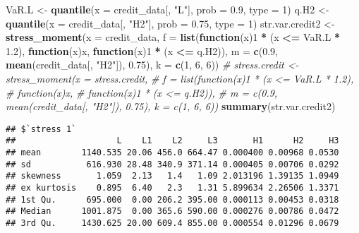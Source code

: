 \documentclass[]{article}
\newenvironment{Shaded}{\begin{snugshade}}{\end{snugshade}}
\newcommand{\CommentTok}[1]{\textcolor[rgb]{0.56,0.35,0.01}{\textit{#1}}}
\newcommand{\ControlFlowTok}[1]{\textcolor[rgb]{0.13,0.29,0.53}{\textbf{#1}}}
\newcommand{\DataTypeTok}[1]{\textcolor[rgb]{0.13,0.29,0.53}{#1}}
\newcommand{\DecValTok}[1]{\textcolor[rgb]{0.00,0.00,0.81}{#1}}
\newcommand{\FloatTok}[1]{\textcolor[rgb]{0.00,0.00,0.81}{#1}}
\newcommand{\KeywordTok}[1]{\textcolor[rgb]{0.13,0.29,0.53}{\textbf{#1}}}
\newcommand{\NormalTok}[1]{#1}
\newcommand{\OperatorTok}[1]{\textcolor[rgb]{0.81,0.36,0.00}{\textbf{#1}}}
\newcommand{\StringTok}[1]{\textcolor[rgb]{0.31,0.60,0.02}{#1}}
\begin{document}
\begin{Shaded}
\begin{Highlighting}[]
\NormalTok{VaR.L <-}\StringTok{ }\KeywordTok{quantile}\NormalTok{(}\DataTypeTok{x =}\NormalTok{ credit_data[, }\StringTok{"L"}\NormalTok{], }\DataTypeTok{prob =} \FloatTok{0.9}\NormalTok{, }\DataTypeTok{type =} \DecValTok{1}\NormalTok{)}
\NormalTok{q.H2 <-}\StringTok{ }\KeywordTok{quantile}\NormalTok{(}\DataTypeTok{x =}\NormalTok{ credit_data[, }\StringTok{"H2"}\NormalTok{], }\DataTypeTok{prob =} \FloatTok{0.75}\NormalTok{, }\DataTypeTok{type =} \DecValTok{1}\NormalTok{)}
\NormalTok{str.var.credit2 <-}\StringTok{ }\KeywordTok{stress_moment}\NormalTok{(}\DataTypeTok{x =}\NormalTok{ credit_data,}
                                \DataTypeTok{f =} \KeywordTok{list}\NormalTok{(}\ControlFlowTok{function}\NormalTok{(x)}\DecValTok{1} \OperatorTok{*}\StringTok{ }\NormalTok{(x }\OperatorTok{<=}\StringTok{ }\NormalTok{VaR.L }\OperatorTok{*}\StringTok{ }\FloatTok{1.2}\NormalTok{),}
                                         \ControlFlowTok{function}\NormalTok{(x)x,}
                                         \ControlFlowTok{function}\NormalTok{(x)}\DecValTok{1} \OperatorTok{*}\StringTok{ }\NormalTok{(x }\OperatorTok{<=}\StringTok{ }\NormalTok{q.H2)),}
                                \DataTypeTok{m =} \KeywordTok{c}\NormalTok{(}\FloatTok{0.9}\NormalTok{, }\KeywordTok{mean}\NormalTok{(credit_data[, }\StringTok{"H2"}\NormalTok{]), }\FloatTok{0.75}\NormalTok{),}
                                \DataTypeTok{k =} \KeywordTok{c}\NormalTok{(}\DecValTok{1}\NormalTok{, }\DecValTok{6}\NormalTok{, }\DecValTok{6}\NormalTok{))}
\CommentTok{# stress.credit <- stress_moment(x = stress.credit,}
\CommentTok{#                                f = list(function(x)1 * (x <= VaR.L * 1.2),}
\CommentTok{#                                         function(x)x,}
\CommentTok{#                                         function(x)1 * (x <= q.H2)),}
\CommentTok{#                                m = c(0.9, mean(credit_data[, "H2"]), 0.75), k = c(1, 6, 6))}
\KeywordTok{summary}\NormalTok{(str.var.credit2)}
\end{Highlighting}
\end{Shaded}

\begin{verbatim}
## $`stress 1`
##                    L    L1    L2     L3       H1      H2     H3
## mean        1140.535 20.06 456.0 664.47 0.000400 0.00968 0.0530
## sd           616.930 28.48 340.9 371.14 0.000405 0.00706 0.0292
## skewness       1.059  2.13   1.4   1.09 2.013196 1.39135 1.0949
## ex kurtosis    0.895  6.40   2.3   1.31 5.899634 2.26506 1.3371
## 1st Qu.      695.000  0.00 206.2 395.00 0.000113 0.00453 0.0318
## Median      1001.875  0.00 365.6 590.00 0.000276 0.00786 0.0472
## 3rd Qu.     1430.625 20.00 609.4 855.00 0.000554 0.01296 0.0679
\end{verbatim}
\end{document}
